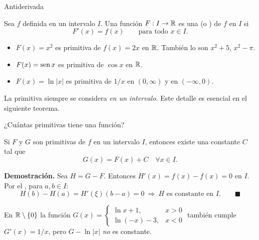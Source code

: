 \documentclass[10pt,aspectratio=169]{beamer}
\begin{document}
\begin{frame}{Antiderivada}
  \begin{definicion}
    Sea $f$ definida en un intervalo $I$. Una función $F:I\to\mathbb{R}$ es una
     (o ) de $f$ en $I$ si
    \[ F'(x)=f(x)\qquad\text{para todo } x\in I. \]
  \end{definicion}
  \begin{ejemplo}
    \begin{itemize}
      \item $F(x)=x^2$ es primitiva de $f(x)=2x$ en $\mathbb{R}$. También lo son $x^2+5$, $x^2-\pi$.
      \item $F(x)=\operatorname{sen} x$ es primitiva de $\cos x$ en $\mathbb{R}$.
      \item $F(x)=\ln|x|$ es primitiva de $1/x$ en $(0,\infty)$ y en $(-\infty,0)$.
    \end{itemize}
  \end{ejemplo}
  \begin{observacion}
    La primitiva siempre se considera \emph{en un intervalo}. Este detalle es esencial en el
    siguiente teorema.
  \end{observacion}
\end{frame}

\begin{frame}{¿Cuántas primitivas tiene una función?}
  \begin{teorema}
    Si $F$ y $G$ son primitivas de $f$ en un intervalo $I$, entonces existe una constante $C$ tal que
    \[ G(x)=F(x)+C\quad\forall x\in I. \]
  \end{teorema}
  \textbf{Demostración.} Sea $H=G-F$. Entonces $H'(x)=f(x)-f(x)=0$ en $I$.
  Por el , para $a,b\in I$:
  \[ H(b)-H(a)=H'(\xi)(b-a)=0 \ \Rightarrow\ H \text{ es constante en } I. \qquad\blacksquare \]
  \begin{observacion}
    En $\mathbb{R}\setminus\{0\}$ la función
    $G(x)=\begin{cases}\ln x+1,& x>0\\ \ln(-x)-3,& x<0\end{cases}$
    también cumple $G'(x)=1/x$, pero $G-\ln|x|$ \emph{no} es constante.
  \end{observacion}
\end{frame}
\end{document}
